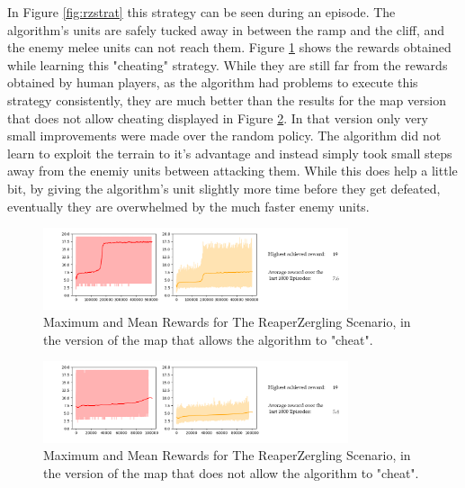 In Figure \ref{fig:rzstrat} this strategy can be seen during an episode. The algorithm's units are safely tucked away in between the ramp and the cliff, and the enemy melee units can not reach them. Figure \ref{fig:rzcheat} shows the rewards obtained while learning this "cheating" strategy. While they are still far from the rewards obtained by human players, as the algorithm had problems to execute this strategy consistently, they are much better than the results for the map version that does not allow cheating displayed in Figure \ref{fig:rznocheat}. In that version only very small improvements were made over the random policy. The algorithm did not learn to exploit the terrain to it's advantage and instead simply took small steps away from the enemiy units between attacking them. While this does help a little bit, by giving the algorithm's unit slightly more time before they get defeated, eventually they are overwhelmed by the much faster enemy units. 


\begin{figure}[htb]
  \centering
      \includegraphics[width=0.8\textwidth]{Figures/plots/plot_rz_acktr_coords_cheat.png}
  \caption{Maximum and Mean Rewards for The ReaperZergling Scenario, in the version of the map that allows the algorithm to "cheat".}
  \label{fig:rzcheat}
\end{figure}

\begin{figure}[htb]
  \centering
      \includegraphics[width=0.8\textwidth]{Figures/plots/plot_rz_acktr.png}
  \caption{Maximum and Mean Rewards for The ReaperZergling Scenario, in the version of the map that does not allow the algorithm to "cheat".}
  \label{fig:rznocheat}
\end{figure}


